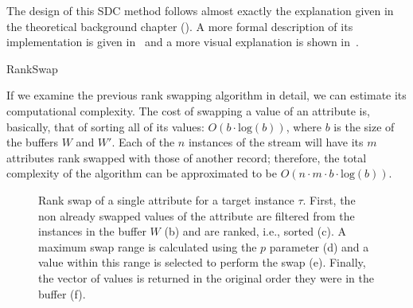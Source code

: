 The design of this SDC method follows almost exactly the explanation given in the theoretical background chapter (). A more formal description of its implementation is given in~ and a more visual explanation is shown in~.

\begin{algorithm}[H]
\caption{RankSwap\label{al:rank-swapping}}
\end{algorithm}

If we examine the previous rank swapping algorithm in detail, we can estimate its computational complexity. The cost of swapping a value of an attribute is, basically, that of sorting all of its values: $O(b \cdot \mathrm{log}(b))$, where $b$ is the size of the buffers $W$ and $W'$. Each of the $n$ instances of the stream will have its $m$ attributes rank swapped with those of another record; therefore, the total complexity of the algorithm can be approximated to be $O(n \cdot m \cdot b \cdot \mathrm{log}(b))$.

\begin{figure}[H]
\centering
{}
\caption[Rank swap of an attribute.]{Rank swap of a single attribute for a target instance $\tau$. First, the non already swapped values of the attribute are filtered from the instances in the buffer $W$ (b) and are ranked, i.e., sorted (c). A maximum swap range is calculated using the $p$ parameter (d) and a value within this range is selected to perform the swap (e). Finally, the vector of values is returned in the original order they were in the buffer (f).}
\label{fig:rank-swapping-schematic-2}
\end{figure}

